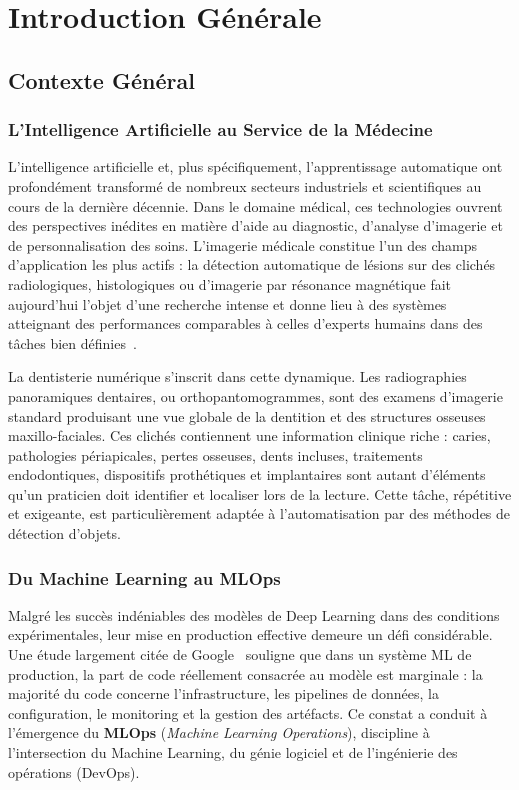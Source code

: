 \documentclass{rapportENSIAS}
\begin{document}
\chapter{Introduction Générale}

\section{Contexte Général}

\subsection{L'Intelligence Artificielle au Service de la Médecine}

L'intelligence artificielle et, plus spécifiquement, l'apprentissage automatique ont profondément transformé de nombreux secteurs industriels et scientifiques au cours de la dernière décennie. Dans le domaine médical, ces technologies ouvrent des perspectives inédites en matière d'aide au diagnostic, d'analyse d'imagerie et de personnalisation des soins. L'imagerie médicale constitue l'un des champs d'application les plus actifs : la détection automatique de lésions sur des clichés radiologiques, histologiques ou d'imagerie par résonance magnétique fait aujourd'hui l'objet d'une recherche intense et donne lieu à des systèmes atteignant des performances comparables à celles d'experts humains dans des tâches bien définies~\cite{litjens2017survey}.

La dentisterie numérique s'inscrit dans cette dynamique. Les radiographies panoramiques dentaires, ou orthopantomogrammes, sont des examens d'imagerie standard produisant une vue globale de la dentition et des structures osseuses maxillo-faciales. Ces clichés contiennent une information clinique riche : caries, pathologies périapicales, pertes osseuses, dents incluses, traitements endodontiques, dispositifs prothétiques et implantaires sont autant d'éléments qu'un praticien doit identifier et localiser lors de la lecture. Cette tâche, répétitive et exigeante, est particulièrement adaptée à l'automatisation par des méthodes de détection d'objets.

\subsection{Du Machine Learning au MLOps}

Malgré les succès indéniables des modèles de Deep Learning dans des conditions expérimentales, leur mise en production effective demeure un défi considérable. Une étude largement citée de Google~\cite{sculley2015hidden} souligne que dans un système ML de production, la part de code réellement consacrée au modèle est marginale : la majorité du code concerne l'infrastructure, les pipelines de données, la configuration, le monitoring et la gestion des artéfacts. Ce constat a conduit à l'émergence du \textbf{MLOps} (\textit{Machine Learning Operations}), discipline à l'intersection du Machine Learning, du génie logiciel et de l'ingénierie des opérations (DevOps).
\end{document}
